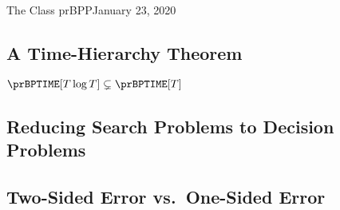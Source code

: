\begin{lecture}{1}{The Class prBPP}{January 23, 2020}
\subsection{A Time-Hierarchy Theorem}

\begin{theorem}
  $\prBPTIME[T \log{T}] \subsetneq \prBPTIME[T]$
\end{theorem}

\subsection{Reducing Search Problems to Decision Problems}

\subsection{Two-Sided Error vs.\ One-Sided Error}

\end{lecture}
